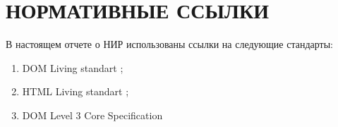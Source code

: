 \section*{НОРМАТИВНЫЕ ССЫЛКИ}

В настоящем отчете о НИР использованы ссылки на следующие стандарты:

\begin{enumerate}[label=\arabic*)]
	\item DOM Living standart \cite{dom-doc};
	\item HTML Living standart \cite{html-doc};
	\item DOM Level 3 Core Specification \cite{not-dynamic}
	
\end{enumerate}

\pagebreak